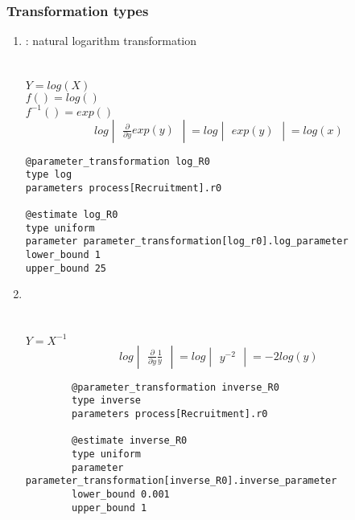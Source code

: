 \subsubsection{Transformation types}\label{subsec:Transformation-types}
\begin{enumerate}
\item {}  : natural logarithm transformation\\
\\
\\
$Y = log(X)$\\
$f() = log()$\\
$f^{-1}() = exp()$
\[
log \begin{vmatrix} \frac{\partial}{\partial y}  exp (y) \end{vmatrix} = log \begin{vmatrix}  exp (y) \end{vmatrix} = log(x)
\]
\label{sec:Transformation-Log}
{\small{\begin{verbatim}
@parameter_transformation log_R0
type log
parameters process[Recruitment].r0

@estimate log_R0
type uniform
parameter parameter_transformation[log_r0].log_parameter
lower_bound 1
upper_bound 25
\end{verbatim}}}


\item {}\\
\\
\\
$Y = X^{-1}$
\[
log \begin{vmatrix} \frac{\partial}{\partial y} \frac{1}{y} \end{vmatrix} = log \begin{vmatrix} y^{-2}\end{vmatrix} = -2log(y)
\]
\label{sec:Transformation-Inverse}
{\small{\begin{verbatim}
		@parameter_transformation inverse_R0
		type inverse
		parameters process[Recruitment].r0
		
		@estimate inverse_R0
		type uniform
		parameter parameter_transformation[inverse_R0].inverse_parameter
		lower_bound 0.001
		upper_bound 1
		\end{verbatim}}}
	

\end{enumerate}
